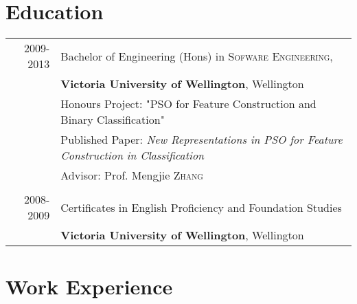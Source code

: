 \documentclass[a4paper,10pt]{article} %
\begin{document}


\section{Education}

\begin{tabular}{rl} 

\textsc{2009-2013} & Bachelor of Engineering (Hons) in \textsc{Sofware Engineering},\\
&\textbf{Victoria University of Wellington}, Wellington\\
& Honours Project: "PSO for Feature Construction and Binary Classification" \\
& Published Paper: \emph{New Representations in PSO for Feature Construction in Classification}\\
& \small Advisor: Prof. Mengjie \textsc{Zhang}\\
& \\


\textsc{2008-2009} & Certificates in English Proficiency and Foundation Studies\\
&\textbf{Victoria University of Wellington}, Wellington\\
\end{tabular}



\section{Work Experience}
\end{document}

